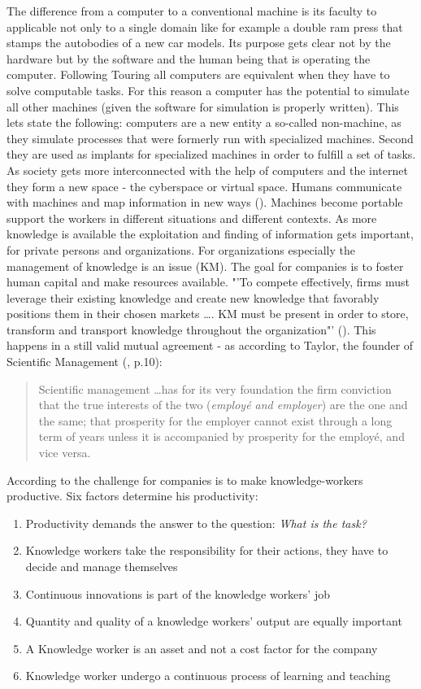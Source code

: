The difference from a computer to a conventional machine is its faculty to applicable not only to a single domain like for example a double ram press that stamps the autobodies of a new car models. Its purpose gets clear not by the hardware but by the software and the human being that is operating the computer. Following Touring all computers are equivalent when they have to solve computable tasks. For this reason a computer has the potential to simulate all other machines (given the software for simulation is properly written). This lets \cite{buhl1997virtuelle} state the following: computers are a new entity a so-called non-machine, as they simulate processes that were formerly run with specialized machines. Second they are used as implants for specialized machines in order to fulfill a set of tasks. As society gets more interconnected with the help of computers and the internet they form a new space - the cyberspace or virtual space. Humans communicate with machines and map information in new ways (\cite{dodge2001atlas}). Machines become portable support the workers in different situations and different contexts. As more knowledge is available the exploitation and finding of information gets important, for private persons and organizations. For organizations especially the management of knowledge is an issue (\ac{KM}).  The goal for companies is to foster human capital and make resources available.  "'To compete effectively, firms must leverage their existing knowledge and create new knowledge that favorably positions them in their chosen markets \dots. \acs{KM} must be present in order to store, transform and transport knowledge throughout the organization"' (\cite{gold2001knowledge}). This happens in a still valid mutual agreement - as according to Taylor, the founder of Scientific Management (\cite{taylor2013scientific}, p.10):
\begin{quotation}
Scientific management \dots has for its very foundation the firm conviction that the true interests of the two (\textit{employé and employer}) are the one and the same; that prosperity for the employer cannot exist through a long term of years unless it is accompanied by prosperity for the employé, and vice versa.
\end{quotation}

According to \cite{drucker1999knowledge} the challenge for companies is to make knowledge-workers productive. Six factors determine his productivity:
\begin{enumerate}
  \item Productivity demands the answer to the question: \textit{What is the task?}
  \item Knowledge workers take the responsibility for their actions, they have to decide and manage themselves
  \item Continuous innovations is part of the knowledge workers' job
  \item Quantity and quality of a knowledge workers' output are equally important
  \item A Knowledge worker is an asset and  not a cost factor for the company
  \item Knowledge worker undergo a continuous process of learning and teaching
\end{enumerate}


